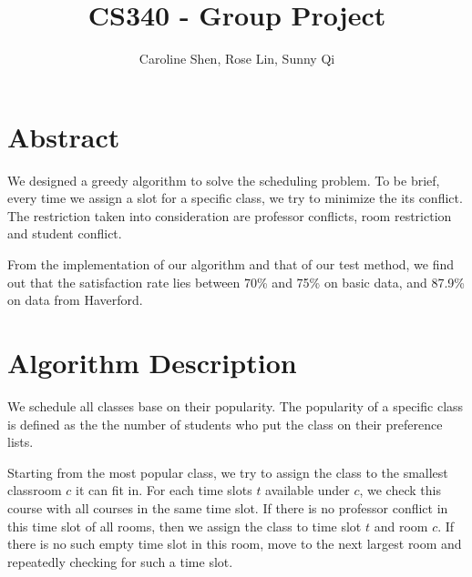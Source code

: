 \documentclass[11pt, oneside]{article}   	%
\title{CS340 - Group Project}
\author{Caroline Shen, Rose Lin, Sunny Qi}
\date{}							%
\begin{document}
\maketitle
\section{Abstract}
We designed a greedy algorithm to solve the scheduling problem. To be brief, every time we assign a slot for a specific class, we try to minimize the its conflict. The restriction taken into consideration are professor conflicts, room restriction and student conflict.

From the implementation of our algorithm and that of our test method, we find out that the satisfaction rate lies between 70\% and 75\% on basic data, and 87.9\% on data from Haverford. 


\section{Algorithm Description}
We schedule all classes base on their popularity. The popularity of a specific class is defined as the the number of students who put the class on their preference lists.

Starting from the most popular class, we try to assign the class to the smallest classroom $c$ it can fit in. For each time slots $t$ available under $c$, we check this course with all courses in the same time slot. 
If there is no professor conflict in this time slot of all rooms, then we assign the class to time slot $t$ and room $c$.
If there is no such empty time slot in this room, move to the next largest room and repeatedly checking for such a time slot. 
\end{document}
